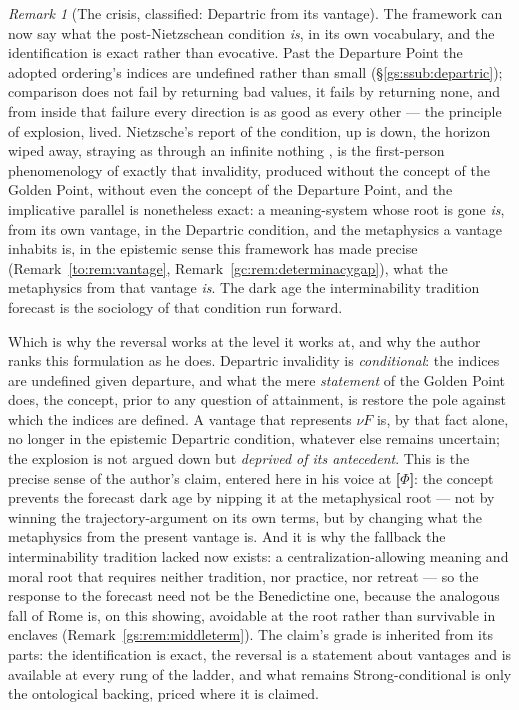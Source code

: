 \documentclass[11pt]{article}
\numberwithin{equation}{section}
\theoremstyle{plain}
\theoremstyle{definition}
\theoremstyle{remark}
\newtheorem{remark}[theorem]{Remark}
\begin{document}
\begin{remark}[The crisis, classified: Departric from its vantage]
\label{gs:rem:crisisdepartric}
The framework can now say what the post-Nietzschean condition
\emph{is}, in its own vocabulary, and the identification is exact
rather than evocative. Past the Departure Point the adopted ordering's
indices are undefined rather than small
(\S\ref{gs:ssub:departric}); comparison does not fail by returning
bad values, it fails by returning none, and from inside that failure
every direction is as good as every other --- the principle of
explosion, lived. Nietzsche's report of the condition, up is down,
the horizon wiped away, straying as through an infinite nothing
\cite{nietzsche1974gay}, is the first-person phenomenology of
exactly that invalidity, produced without the concept of the Golden
Point, without even the concept of the Departure Point, and the
implicative parallel is nonetheless exact: a meaning-system whose
root is gone \emph{is}, from its own vantage, in the Departric
condition, and the metaphysics a vantage inhabits is, in the epistemic
sense this framework has made precise
(Remark~\ref{to:rem:vantage}, Remark~\ref{gc:rem:determinacygap}),
what the metaphysics from that vantage \emph{is}. The dark age the
interminability tradition forecast is the sociology of that
condition run forward.

Which is why the reversal works at the level it works at, and why the
author ranks this formulation as he does. Departric invalidity is
\emph{conditional}: the indices are undefined given departure, and
what the mere \emph{statement} of the Golden Point does, the
concept, prior to any question of attainment, is restore the pole
against which the indices are defined. A vantage that represents
$\nu F$ is, by that fact alone, no longer in the epistemic Departric
condition, whatever else remains uncertain; the explosion is not
argued down but \emph{deprived of its antecedent}. This is the
precise sense of the author's claim, entered here in his voice at
\textbf{[$\Phi$]}: the concept prevents the forecast dark age by
nipping it at the metaphysical root --- not by winning the
trajectory-argument on its own terms, but by changing what the
metaphysics from the present vantage is. And it is why the fallback
the interminability tradition lacked now exists: a
centralization-allowing meaning and moral root that requires neither
tradition, nor practice, nor retreat --- so the response to the
forecast need not be the Benedictine one, because the analogous fall
of Rome is, on this showing, avoidable at the root rather than
survivable in enclaves (Remark~\ref{gs:rem:middleterm}). The claim's
grade is inherited from its parts: the identification is exact, the
reversal is a statement about vantages and is available at every rung
of the ladder, and what remains Strong-conditional is only the
ontological backing, priced where it is claimed.
\end{remark}
\end{document}
